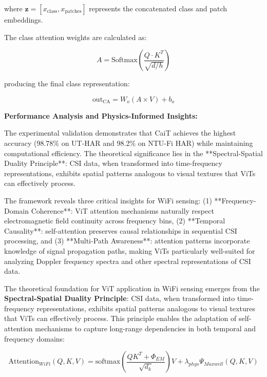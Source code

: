 \documentclass[journal]{IEEEtran}
\begin{document}
where $\mathbf{z} = [x_{\text{class}}, x_{\text{patches}}]$ represents the concatenated class and patch embeddings.

The class attention weights are calculated as:

\begin{equation}
A = \text{Softmax}\left(\frac{Q \cdot K^T}{\sqrt{d/h}}\right)
\label{eq:vit_cait_attention}
\end{equation}

producing the final class representation:

\begin{equation}
\text{out}_{\text{CA}} = W_o (A \times V) + b_o
\label{eq:vit_cait_output}
\end{equation}

\textbf{Performance Analysis and Physics-Informed Insights:}

The experimental validation demonstrates that CaiT achieves the highest accuracy (98.78\% on UT-HAR and 98.2\% on NTU-Fi HAR) while maintaining computational efficiency. The theoretical significance lies in the **Spectral-Spatial Duality Principle**: CSI data, when transformed into time-frequency representations, exhibits spatial patterns analogous to visual textures that ViTs can effectively process.

The framework reveals three critical insights for WiFi sensing: (1) **Frequency-Domain Coherence**: ViT attention mechanisms naturally respect electromagnetic field continuity across frequency bins, (2) **Temporal Causality**: self-attention preserves causal relationships in sequential CSI processing, and (3) **Multi-Path Awareness**: attention patterns incorporate knowledge of signal propagation paths, making ViTs particularly well-suited for analyzing Doppler frequency spectra and other spectral representations of CSI data.

The theoretical foundation for ViT application in WiFi sensing emerges from the \textbf{Spectral-Spatial Duality Principle}: CSI data, when transformed into time-frequency representations, exhibits spatial patterns analogous to visual textures that ViTs can effectively process. This principle enables the adaptation of self-attention mechanisms to capture long-range dependencies in both temporal and frequency domains:

\begin{equation}
\text{Attention}_{WiFi}(Q,K,V) = \text{softmax}\left(\frac{QK^T + \Phi_{EM}}{\sqrt{d_k}}\right)V + \lambda_{phys} \Psi_{Maxwell}(Q,K,V)
\label{eq:vit_physics_attention}
\end{equation}
\end{document}
